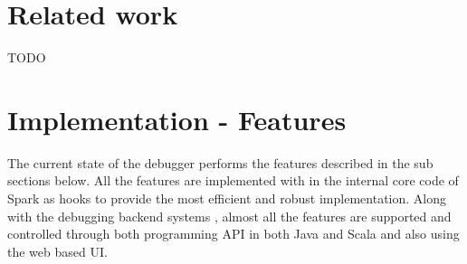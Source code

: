 \documentclass{acm_proc_article-sp}
\begin{document}
\section{Related work}

TODO

\section{Implementation - Features}
The current state of the debugger performs the features described in the sub sections below. All the features are implemented with in the internal core code of Spark as hooks to provide the most efficient and robust implementation. Along with the debugging backend systems , almost all the features are supported and controlled through both programming API in both Java and Scala and also using the web based UI.
\end{document}
